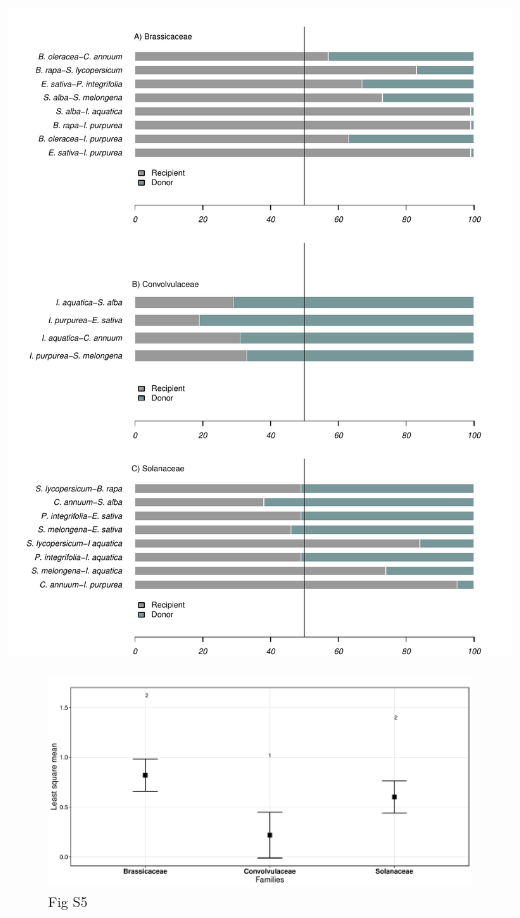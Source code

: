 \documentclass[
  12pt,
]{article}
\begin{document}
\includegraphics{Supp_Material_files/figure-latex/unnamed-chunk-6-1.pdf}

\newpage

\begin{figure}

{\centering \includegraphics{Supp_Material_files/figure-latex/unnamed-chunk-7-1} 

}

\caption{Fig S5}\label{fig:unnamed-chunk-7}
\end{figure}
\end{document}
